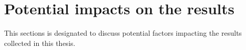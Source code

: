 \section{Potential impacts on the results }
\label{sec:truth_results}
This sections is designated to discuss potential factors impacting the results collected in this thesis.






